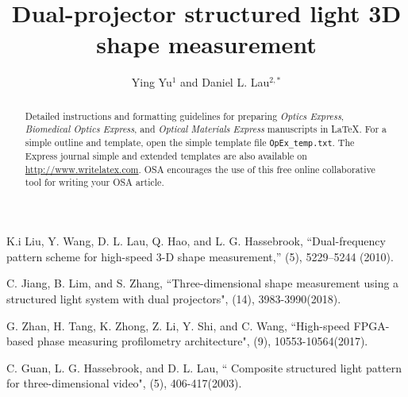 \documentclass[10pt,letterpaper]{article}
\begin{document}
\title{Dual-projector structured light 3D shape measurement}

\author{Ying Yu$^1$ and Daniel L. Lau$^{2,*}$}

\address{$^1$Department of Electrical and Computer Engineering, University of Kentucky, Lexington, KY, 40506, USA\\
$^2$Department of Electrical and Computer Engineering, University of Kentucky, Lexington, KY, 40506, USA}




\begin{abstract}
Detailed instructions and formatting guidelines for preparing \textit{Optics Express}, \textit{Biomedical Optics Express}, and \textit{Optical Materials Express} manuscripts in \LaTeX. For a simple outline and template, open the simple template file \texttt{OpEx\_temp.txt}. The Express journal simple and extended templates are also available on \url{http://www.writelatex.com}. OSA encourages the use of this free online collaborative tool for writing your OSA article.
\end{abstract}


\begin{thebibliography}{99}

K.i Liu, Y. Wang, D. L. Lau, Q. Hao, and L. G. Hassebrook, ``Dual-frequency pattern scheme for high-speed 3-D shape measurement,'' (5), 5229--5244 (2010).

C. Jiang, B. Lim, and S. Zhang, ``Three-dimensional shape measurement using a structured light system with dual projectors", (14), 3983-3990(2018).

G. Zhan, H. Tang, K. Zhong, Z. Li, Y. Shi, and C. Wang, ``High-speed FPGA-based phase measuring profilometry architecture", (9), 10553-10564(2017).

C. Guan, L. G. Hassebrook, and D. L. Lau, `` Composite structured light pattern for three-dimensional video",  (5), 406-417(2003).
\end{thebibliography} 
\end{document}
